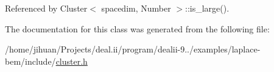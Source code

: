 Referenced by Cluster$<$ spacedim, Number $>$\+::is\+\_\+large().



The documentation for this class was generated from the following file\+:\begin{DoxyCompactItemize}
\item 
/home/jihuan/\+Projects/deal.\+ii/program/dealii-\/9../examples/laplace-\/bem/include/\hyperlink{cluster_8h}{cluster.\+h}\end{DoxyCompactItemize}
